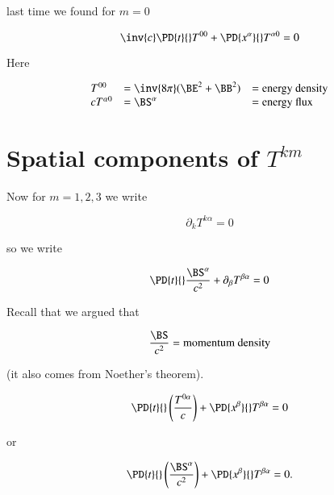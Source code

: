 last time we found for $m = 0$

\begin{equation}\label{eqn:relativisticElectrodynamicsL23:50}
\inv{c} \PD{t}{} T^{0 0} + \PD{x^\alpha}{} T^{\alpha 0} = 0
\end{equation}

Here

\begin{equation}\label{eqn:relativisticElectrodynamicsL23:70}
\begin{array}{l l l}
T^{0 0} &= \inv{8 \pi} (\BE^2 + \BB^2) &= \mbox{energy density} \\
c T^{\alpha 0} &= \BS^\alpha &= \mbox{energy flux}
\end{array}
\end{equation}

\section{Spatial components of $T^{k m}$}

Now for $m = 1,2,3$ we write

\begin{equation}\label{eqn:relativisticElectrodynamicsL23:90}
\partial_k T^{k \alpha} = 0
\end{equation}

so we write

\begin{equation}\label{eqn:relativisticElectrodynamicsL23:110}
\PD{t}{} \frac{\BS^\alpha}{c^2} + \partial_\beta T^{\beta \alpha} = 0
\end{equation}

Recall that we argued that

\begin{equation}\label{eqn:relativisticElectrodynamicsL23:130}
\frac{\BS}{c^2} = \text{momentum density}
\end{equation}

(it also comes from Noether's theorem).

\begin{equation}\label{eqn:relativisticElectrodynamicsL23:150}
\PD{t}{} \left( \frac{T^{0\alpha}}{c} \right) + \PD{x^\beta}{} T^{\beta \alpha} = 0
\end{equation}

or

\begin{equation}\label{eqn:relativisticElectrodynamicsL23:170}
\PD{t}{} \left( \frac{\BS^{\alpha}}{c^2} \right) + \PD{x^\beta}{} T^{\beta \alpha} = 0.
\end{equation}

